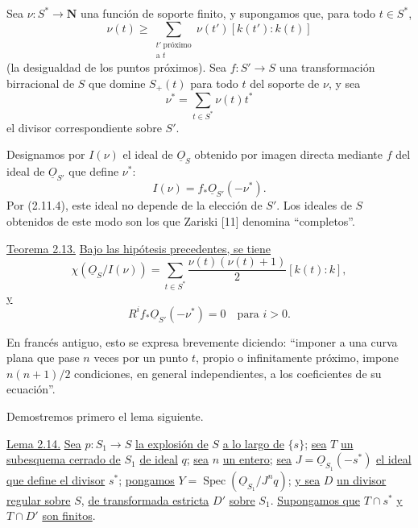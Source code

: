 Sea $\nu:S^*\longrightarrow\mathbf N$ una función de soporte finito, y
supongamos que, para todo $t\in S^*$,
\begin{equation}\tag{2.12.1}
\nu(t)\geq
\sum_{\substack{t'\ \text{próximo}\\\text{a }t}}
\nu(t')[k(t'):k(t)]
\end{equation}
(la desigualdad de los puntos próximos). Sea $f:S'\longrightarrow S$ una
transformación birracional de $S$ que domine $S_+(t)$ para todo $t$ del soporte
de $\nu$, y sea
\begin{equation*}
\nu^*=\sum_{t\in S^*}\nu(t)t^*
\end{equation*}
el divisor correspondiente sobre $S'$.

\pageoriginale

Designamos por $I(\nu)$ el ideal de $\underline{O}_S$ obtenido por imagen
directa mediante $f$ del ideal de $\underline{O}_{S'}$ que define $\nu^*$:
\begin{equation*}
I(\nu)=f_*\underline{O}_{S'}(-\nu^*).
\end{equation*}
Por (2.11.4), este ideal no depende de la elección de $S'$. Los ideales de $S$
obtenidos de este modo son los que Zariski [11] denomina ``completos''.

\medskip
\noindent\underline{Teorema 2.13.}
\underline{Bajo las hipótesis precedentes, se tiene}
\begin{equation*}
\chi(\underline{O}_S/I(\nu))
=\sum_{t\in S^*}\frac{\nu(t)(\nu(t)+1)}2[k(t):k],
\end{equation*}
\underline{y}
\begin{equation*}
R^if_*\underline{O}_{S'}(-\nu^*)=0
\quad\text{para }i>0.
\end{equation*}

En francés antiguo, esto se expresa brevemente diciendo: ``imponer a una curva
plana que pase $n$ veces por un punto $t$, propio o infinitamente próximo,
impone $n(n+1)/2$ condiciones, en general independientes, a los coeficientes de
su ecuación''.

Demostremos primero el lema siguiente.

\medskip
\noindent\underline{Lema 2.14.}
\underline{Sea} $p:S_1\longrightarrow S$ \underline{la explosión de} $S$
\underline{a lo largo de} $\{s\}$; \underline{sea} $T$ \underline{un
subesquema cerrado de} $S_1$ \underline{de ideal} $q$;
\underline{sea} $n$
\underline{un entero}; \underline{sea}
$J=\underline{O}_{S_1}(-s^*)$ \underline{el ideal que define el divisor}
$s^*$; \underline{pongamos}
$Y=\operatorname{Spec}(\underline{O}_{S_1}/J^nq)$; \underline{y sea} $D$
\underline{un divisor regular sobre} $S$, \underline{de transformada estricta}
$D'$ \underline{sobre} $S_1$. \underline{Supongamos que} $T\cap s^*$
\underline{y} $T\cap D'$ \underline{son finitos}.

